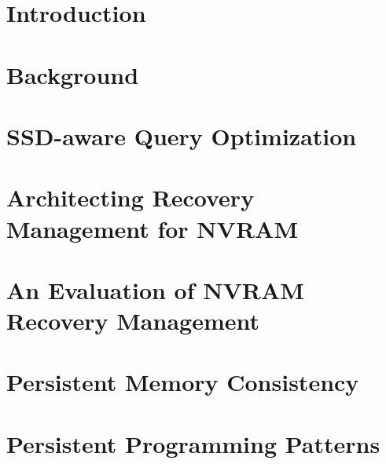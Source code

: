 \documentclass[reqno,12pt,oneside]{report} %
\theoremstyle{plain}
\theoremstyle{definition}
\theoremstyle{remark}
\numberwithin{theorem}{chapter}     %
\begin{document}
 \chapter{Introduction}
 \label{chap:Intro}
 

 \chapter{Background}
 \label{chap:Background}
 

 \chapter{SSD-aware Query Optimization}
 \label{chap:FlashOpti}
 

 \chapter{Architecting Recovery Management for NVRAM}
 \label{chap:OLTP_design}
 

 \chapter{An Evaluation of NVRAM Recovery Management}
 \label{chap:OLTP_eval}
 

 \chapter{Persistent Memory Consistency}
 \label{chap:PMC}
 

 \chapter{Persistent Programming Patterns}
 \label{chap:PMC_patterns}
 

\startappendices
 \label{app:PowerRouting}
 

 \label{app:WEED}
 
 
\startbibliography
 \begin{singlespace} %
 \end{singlespace}

%
\end{document}
